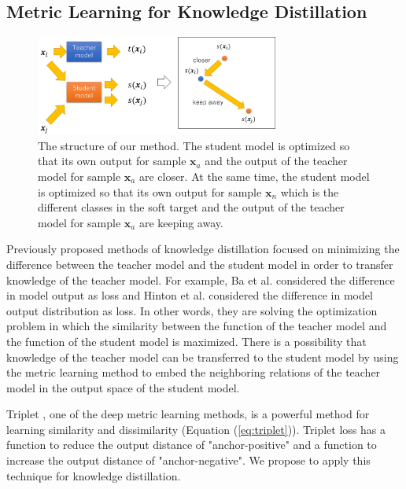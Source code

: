 \documentclass[a4paper,12pt]{article}
\begin{document}
\subsection{Metric Learning for Knowledge Distillation}
\begin{figure}[ht]
\begin{center}
\includegraphics[width=80mm]{figure_ours.png}
\caption{The structure of our method. The student model is optimized so that its own output for sample $\bm{x}_a$ and the output of the teacher model for sample $\bm{x}_a$ are closer. At the same time, the student model is optimized so that its own output for sample $\bm{x}_n$ which is the different classes in the soft target and the output of the teacher model for sample $\bm{x}_a$ are keeping away.}
\label{fig:ours}
\end{center}
\end{figure}

Previously proposed methods of knowledge distillation focused on minimizing the difference between the teacher model and the student model in order to transfer knowledge of the teacher model.
For example,  Ba et al. \cite{Ba2014} considered the difference in model output as loss and Hinton et al. \cite{Hinton2015} considered the difference in model output distribution as loss.
In other words, they are solving the optimization problem in which the similarity between the function of the teacher model and the function of the student model is maximized.
There is a possibility that knowledge of the teacher model can be transferred to the student model by using the metric learning method to embed the neighboring relations of the teacher model in the output space of the student model.

Triplet \cite{Hoffer2015}, one of the deep metric learning methods, is a powerful method for learning similarity and dissimilarity (Equation (\ref{eq:triplet})).
Triplet loss has a function to reduce the output distance of "anchor-positive" and a function to increase the output distance of "anchor-negative".
We propose to apply this technique for knowledge distillation.
\end{document}
